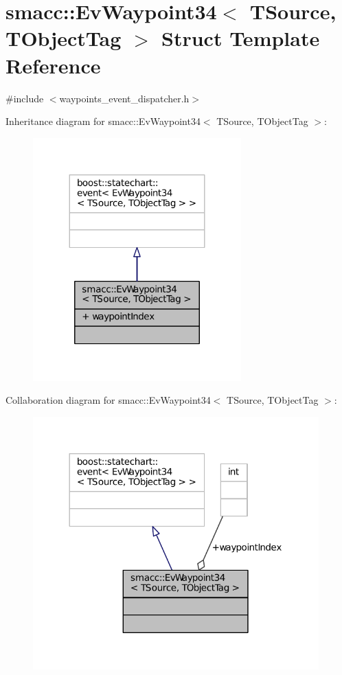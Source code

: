 \hypertarget{structsmacc_1_1EvWaypoint34}{}\section{smacc\+:\+:Ev\+Waypoint34$<$ T\+Source, T\+Object\+Tag $>$ Struct Template Reference}
\label{structsmacc_1_1EvWaypoint34}


{\ttfamily \#include $<$waypoints\+\_\+event\+\_\+dispatcher.\+h$>$}



Inheritance diagram for smacc\+:\+:Ev\+Waypoint34$<$ T\+Source, T\+Object\+Tag $>$\+:
\nopagebreak
\begin{figure}[H]
\begin{center}
\leavevmode
\includegraphics[width=227pt]{structsmacc_1_1EvWaypoint34__inherit__graph}
\end{center}
\end{figure}


Collaboration diagram for smacc\+:\+:Ev\+Waypoint34$<$ T\+Source, T\+Object\+Tag $>$\+:
\nopagebreak
\begin{figure}[H]
\begin{center}
\leavevmode
\includegraphics[width=312pt]{structsmacc_1_1EvWaypoint34__coll__graph}
\end{center}
\end{figure}
